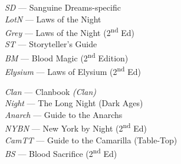 \begin{minipage}{0.5\textwidth}
   \begin{flushleft}
	{\scriptsize
	\emph{SD} --- Sanguine Dreams-specific \\
	\emph{LotN} --- Laws of the Night \\
	\emph{Grey} --- Laws of the Night (2\textsuperscript{nd} Ed) \\
	\emph{ST} --- Storyteller's Guide \\
	\emph{BM} --- Blood Magic (2\textsuperscript{nd} Edition) \\
	\emph{Elysium} --- Laws of Elysium (2\textsuperscript{nd} Ed) \\ }
	\end{flushleft}
\end{minipage}
\begin{minipage}{0.5\textwidth}
   \begin{flushleft}
	{\scriptsize 
	\emph{Clan} --- Clanbook \emph{(Clan)} \\
	\emph{Night} --- The Long Night (Dark Ages) \\
	\emph{Anarch} --- Guide to the Anarchs \\
	\emph{NYBN} --- New York by Night (2\textsuperscript{nd} Ed) \\
	\emph{CamTT} --- Guide to the Camarilla (Table-Top) \\
	\emph{BS} --- Blood Sacrifice (2\textsuperscript{nd} Ed) \\ }
	\end{flushleft}
\end{minipage}